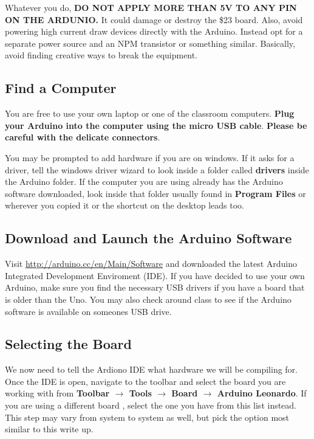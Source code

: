 \documentclass[11pt,a4paper]{article}
\begin{document}
Whatever you do, \textbf{DO NOT APPLY MORE THAN 5V TO ANY PIN ON THE ARDUNIO.}  It could damage or destroy the \$23 board.  Also, avoid powering high current draw devices directly with the Arduino.  Instead opt for a separate power source and an NPM transistor or something similar.  Basically, avoid finding creative ways to break the equipment.

\subsection{Find a Computer} %
\label{sub:find_a_computer}
You are free to use your own laptop or one of the classroom computers.  \textbf{Plug your Arduino into the computer using the micro USB cable}.  \textbf{Please be careful with the delicate connectors}.  

You may be prompted to add hardware if you are on windows.  If it asks for a driver, tell the windows driver wizard to look inside a folder called \textbf{drivers} inside the Arduino folder.  If the computer you are using already has the Arduino software downloaded, look inside that folder usually found in \textbf{Program Files} or wherever you copied it or the shortcut on the desktop leads too.


\subsection{Download and Launch the Arduino Software} %
\label{sub:download_and_launch_the_arduino_software}
Visit \url{http://arduino.cc/en/Main/Software} and downloaded the latest Arduino Integrated Development Enviroment (IDE)\cite{arduino_dl}.  If you have decided to use your own Arduino, make sure you find the necessary USB drivers if you have a board that is older than the Uno.  You may also check around class to see if the Arduino software is available on someones USB drive.


\subsection{Selecting the Board} %
\label{sub:selecting_the_board}
We now need to tell the Ardiono IDE what hardware we will be compiling for. Once the IDE is open, navigate to the toolbar and select the board you are working with from \textbf{Toolbar $\rightarrow$ Tools $\rightarrow$ Board $\rightarrow$ Arduino Leonardo}.  If you are using a different board , select the one you have from this list instead.  This step may vary from system to system as well, but pick the option most similar to this write up.
\end{document}
